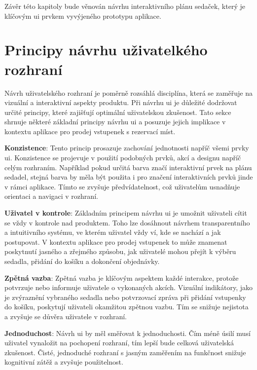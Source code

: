 Závěr této kapitoly bude věnován návrhu interaktivního plánu sedaček, který je klíčovým \ac{ui} prvkem vyvýjeného prototypu aplikace.

\section{Principy návrhu uživatelkého rozhraní}
\label{sec:navrh-principy}
Návrh uživatelského rozhraní je poměrně rozsáhlá disciplína, která se zaměřuje na vizuální a interaktivní aspekty produktu.
Při návrhu \ac{ui} je důležité dodržovat určité principy, které zajišťují optimální uživatelskou zkušenost.
Tato sekce shrnuje některé základní principy návrhu \ac{ui} a posuzuje jejich implikace v kontextu aplikace pro prodej vstupenek s rezervací míst.

\textbf{Konzistence}: Tento princip prosazuje zachování jednotnosti napříč všemi prvky \ac{ui}.
Konzistence se projevuje v použití podobných prvků, akcí a designu napříč celým rozhraním.
Například pokud určitá barva značí interaktivní prvek na plánu sedadel, stejná barva by měla být použita i pro značení interaktivních prvků jinde v rámci aplikace.
Tímto se zvyšuje předvídatelnost, což uživatelům usnadňuje orientaci a navigaci v rozhraní.

\textbf{Uživatel v kontrole}: Základním principem návrhu \ac{ui} je umožnit uživateli cítit se vždy v kontrole nad produktem.
Toho lze dosáhnout návrhem transparentního a intuitivního systému, ve kterém uživatel vždy ví, kde se nachází a jak postupovat.
V kontextu aplikace pro prodej vstupenek to může znamenat poskytnutí jasného a zřejmého způsobu, jak uživatelé mohou přejít k výběru sedadla, přidání do košíku a dokončení objednávky.

\textbf{Zpětná vazba}: Zpětná vazba je klíčovým aspektem každé interakce, protože potvrzuje nebo informuje  uživatele o vykonaných akcích.
Vizuální indikátory, jako je zvýraznění vybraného sedadla nebo potvrzovací zpráva při přidání vstupenky do košíku, poskytují uživateli okamžitou zpětnou vazbu.
Tím se snižuje nejistota a zvyšuje se důvěra uživatele v rozhraní.

\textbf{Jednoduchost}: Návrh \ac{ui} by měl směřovat k jednoduchosti.
Čím méně úsilí musí uživatel vynaložit na pochopení rozhraní, tím lepší bude celková uživatelská zkušenost.
Čisté, jednoduché rozhraní s jasným zaměřením na funkčnost snižuje kognitivní zátěž a zvyšuje použitelnost.

